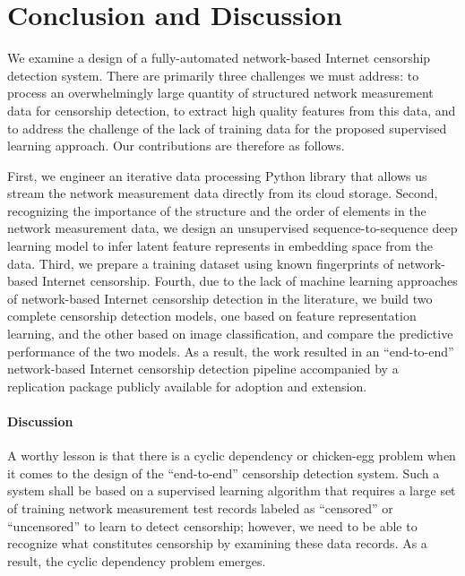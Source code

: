 \section{Conclusion and Discussion}
\label{sec:summary}

We examine a design of a fully-automated network-based Internet censorship
detection system. There are primarily three challenges we must address: to
process an overwhelmingly large quantity of structured network measurement data for
censorship detection, to extract high quality features from this data, 
and to address the challenge of the lack of training
data for the proposed supervised learning approach.  Our contributions are
therefore as follows. 

First, we engineer an iterative data processing Python library that allows us
stream the network measurement data directly from its cloud storage. Second,
recognizing the importance of the structure and the order of elements in the
network measurement data, we design an unsupervised sequence-to-sequence deep
learning model to infer latent feature represents in embedding space from the
data. Third, we prepare a training dataset using known fingerprints of
network-based Internet censorship. Fourth, due to the lack of machine learning
approaches of network-based Internet censorship detection in the literature, we
build two complete censorship detection models, one based on feature
representation learning, and the other based on image classification, and
compare the predictive performance of the two models. As a result, the work
resulted in an ``end-to-end'' network-based Internet censorship detection
pipeline accompanied by a replication package publicly available for adoption
and extension.

\paragraph{Discussion} A worthy lesson is that there is a cyclic dependency or chicken-egg problem
when it comes to the design of the ``end-to-end'' censorship detection system.
Such a system shall be based on a supervised learning algorithm that requires a
large set of training network measurement test records labeled as ``censored''
or ``uncensored'' to learn to detect censorship; however, we need to be able
to recognize what constitutes censorship by examining these data records. As
a result, the cyclic dependency problem emerges. 

